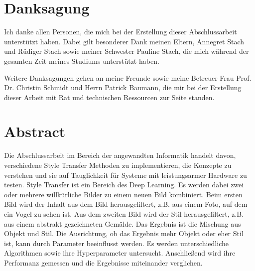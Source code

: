 \chapter*{Danksagung}

Ich danke allen Personen, die mich bei der Erstellung dieser Abschlussarbeit unterstützt haben. Dabei gilt besonderer Dank meinen Eltern, Annegret Stach und Rüdiger Stach sowie meiner Schwester Pauline Stach, die mich während der gesamten Zeit meines Studiums unterstützt haben.

Weitere Danksagungen gehen an meine Freunde sowie meine Betreuer Frau Prof. Dr. Christin Schmidt und Herrn Patrick Baumann, die mir bei der Erstellung dieser Arbeit mit Rat und technischen Ressourcen zur Seite standen.

\pagebreak

\chapter*{Abstract}

Die Abschlussarbeit im Bereich der angewandten Informatik handelt davon, verschiedene Style Transfer Methoden zu implementieren, die Konzepte zu verstehen und sie auf Tauglichkeit für Systeme mit leistungsarmer Hardware zu testen. Style Transfer ist ein Bereich des Deep Learning. Es werden dabei zwei oder mehrere willkürliche Bilder zu einem neuen Bild kombiniert. Beim ersten Bild wird der Inhalt aus dem Bild herausgefiltert, z.B. aus einem Foto, auf dem ein Vogel zu sehen ist. Aus dem zweiten Bild wird der Stil herausgefiltert, z.B. aus einem abstrakt gezeichneten Gemälde. Das Ergebnis ist die Mischung aus Objekt und Stil. Die Ausrichtung, ob das Ergebnis mehr Objekt oder eher Stil ist, kann durch Parameter beeinflusst werden. Es werden unterschiedliche Algorithmen sowie ihre Hyperparameter untersucht. Anschließend wird ihre Performanz gemessen und die Ergebnisse miteinander verglichen.